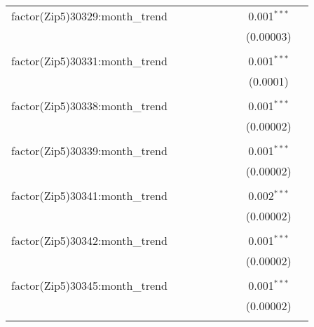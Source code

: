 \begin{table}[H]
{\begin{tabular}{@{\extracolsep{5pt}}lcccccccc}
  factor(Zip5)30329:month\_trend &  &  &  &  &  &  & 0.001$^{***}$ &  \\  

   &  &  &  &  &  &  & (0.00003) &  \\  

   & & & & & & & & \\  

  factor(Zip5)30331:month\_trend &  &  &  &  &  &  & 0.001$^{***}$ &  \\  

   &  &  &  &  &  &  & (0.0001) &  \\  

   & & & & & & & & \\  

  factor(Zip5)30338:month\_trend &  &  &  &  &  &  & 0.001$^{***}$ &  \\  

   &  &  &  &  &  &  & (0.00002) &  \\  

   & & & & & & & & \\  

  factor(Zip5)30339:month\_trend &  &  &  &  &  &  & 0.001$^{***}$ &  \\  

   &  &  &  &  &  &  & (0.00002) &  \\  

   & & & & & & & & \\  

  factor(Zip5)30341:month\_trend &  &  &  &  &  &  & 0.002$^{***}$ &  \\  

   &  &  &  &  &  &  & (0.00002) &  \\  

   & & & & & & & & \\  

  factor(Zip5)30342:month\_trend &  &  &  &  &  &  & 0.001$^{***}$ &  \\  

   &  &  &  &  &  &  & (0.00002) &  \\  

   & & & & & & & & \\  

  factor(Zip5)30345:month\_trend &  &  &  &  &  &  & 0.001$^{***}$ &  \\  

   &  &  &  &  &  &  & (0.00002) &  \\  

   & & & & & & & & \\  


\end{tabular}}
\end{table}
